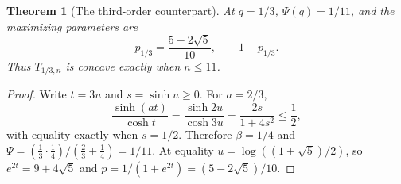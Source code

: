 \documentclass[11pt]{article}
\numberwithin{equation}{section}
\newtheorem{theorem}{Theorem}[section]
\theoremstyle{definition}
\theoremstyle{remark}
\begin{document}
\begin{theorem}[The third-order counterpart]\label{bep:pe:thm:third}
At $q=1/3$, $\Psi(q)=1/11$, and the maximizing parameters are
\begin{equation}
 p_{1/3}=\frac{5-2\sqrt5}{10},\qquad1-p_{1/3}.
\end{equation}
Thus $T_{1/3,n}$ is concave exactly when $n\leq11$.
\end{theorem}
\begin{proof}
Write $t=3u$ and $s=\sinh u\geq0$. For $a=2/3$,
\[
 \frac{\sinh(at)}{\cosh t}
 =\frac{\sinh2u}{\cosh3u}=\frac{2s}{1+4s^2}\leq\frac12,
\]
with equality exactly when $s=1/2$. Therefore $\beta=1/4$ and
$\Psi=(\tfrac13\cdot\tfrac14)/(\tfrac23+\tfrac14)=1/11$.
At equality $u=\log((1+\sqrt5)/2)$, so
$e^{2t}=9+4\sqrt5$ and $p=1/(1+e^{2t})=(5-2\sqrt5)/10$.
\end{proof}
\end{document}
